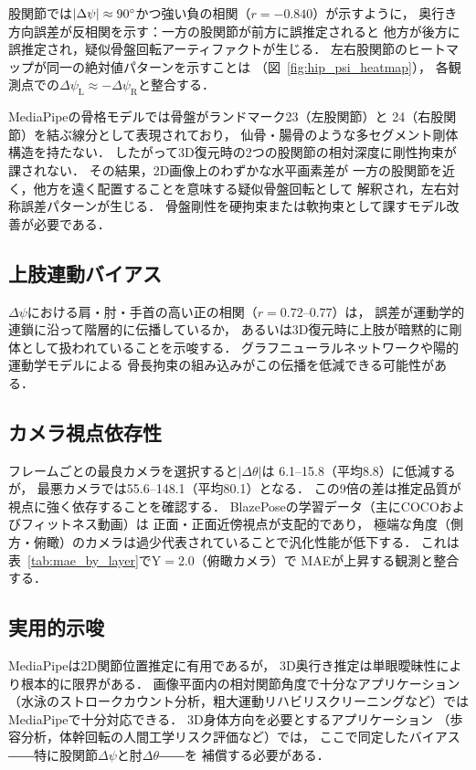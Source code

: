 \documentclass[twocolumn]{article}
\begin{document}
股関節では$|\Delta\psi|\approx90\degree{}$かつ強い負の相関（$r=-0.840$）が示すように，
奥行き方向誤差が反相関を示す：一方の股関節が前方に誤推定されると
他方が後方に誤推定され，疑似骨盤回転アーティファクトが生じる．
左右股関節のヒートマップが同一の絶対値パターンを示すことは
（図~\ref{fig:hip_psi_heatmap}），
各観測点での$\Delta\psi_{\text{L}} \approx -\Delta\psi_{\text{R}}$と整合する．

MediaPipeの骨格モデルでは骨盤がランドマーク23（左股関節）と
24（右股関節）を結ぶ線分として表現されており，
仙骨・腸骨のような多セグメント剛体構造を持たない．
したがって3D復元時の2つの股関節の相対深度に剛性拘束が課されない．
その結果，2D画像上のわずかな水平画素差が
一方の股関節を近く，他方を遠く配置することを意味する疑似骨盤回転として
解釈され，左右対称誤差パターンが生じる．
骨盤剛性を硬拘束または軟拘束として課すモデル改善が必要である．

\subsection{上肢連動バイアス}

$\Delta\psi$における肩・肘・手首の高い正の相関（$r=0.72$--$0.77$）は，
誤差が運動学的連鎖に沿って階層的に伝播しているか，
あるいは3D復元時に上肢が暗黙的に剛体として扱われていることを示唆する．
グラフニューラルネットワークや陽的運動学モデルによる
骨長拘束の組み込みがこの伝播を低減できる可能性がある．

\subsection{カメラ視点依存性}

フレームごとの最良カメラを選択すると$|\Delta\theta|$は
6.1\degree{}--15.8\degree{}（平均8.8\degree{}）に低減するが，
最悪カメラでは55.6\degree{}--148.1\degree{}（平均80.1\degree{}）となる．
この9倍の差は推定品質が視点に強く依存することを確認する．
BlazePoseの学習データ（主にCOCO\cite{coco}およびフィットネス動画\cite{blazepose}）は
正面・正面近傍視点が支配的であり，
極端な角度（側方・俯瞰）のカメラは過少代表されていることで汎化性能が低下する．
これは表~\ref{tab:mae_by_layer}でY$=$2.0（俯瞰カメラ）で
MAEが上昇する観測と整合する．

\subsection{実用的示唆}

MediaPipeは2D関節位置推定に有用であるが，
3D奥行き推定は単眼曖昧性により根本的に限界がある．
画像平面内の相対関節角度で十分なアプリケーション
（水泳のストロークカウント分析，粗大運動リハビリスクリーニングなど）では
MediaPipeで十分対応できる．
3D身体方向を必要とするアプリケーション
（歩容分析，体幹回転の人間工学リスク評価など）では，
ここで同定したバイアス――特に股関節$\Delta\psi$と肘$\Delta\theta$――を
補償する必要がある．
\end{document}
